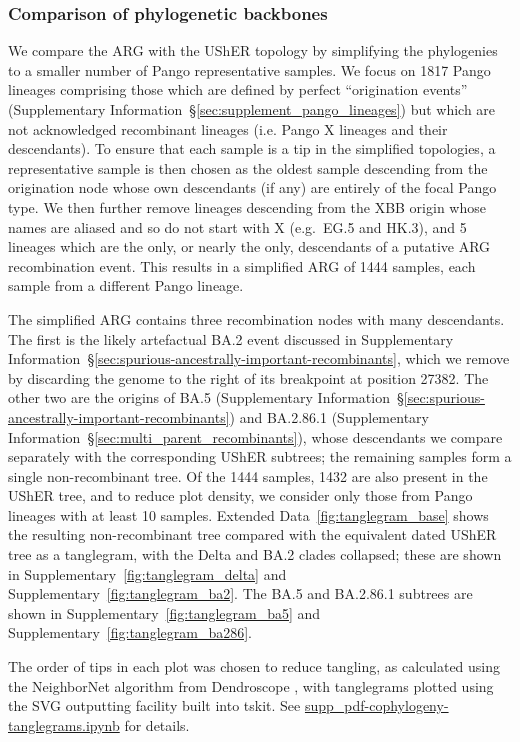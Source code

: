 \documentclass[12pt]{article}
\newcommand{\supref}[1]{Supplementary Information~\S\ref{#1}}
\newcommand{\edref}[1]{Extended Data~\ref{#1}}
\newcommand{\siref}[1]{Supplementary~\ref{#1}}
\begin{document}
\subsubsection*{Comparison of phylogenetic backbones}
We compare the ARG with the UShER topology
by simplifying the phylogenies to a smaller number of
Pango representative samples.
We focus on 1817 Pango lineages comprising those which are defined by perfect ``origination events''
(\supref{sec:supplement_pango_lineages})
but which are not acknowledged recombinant lineages (i.e. Pango X lineages and their descendants).
To ensure that each sample is a tip in the simplified topologies,
a representative sample is then chosen as the oldest sample
descending from the origination node
whose own descendants (if any) are entirely of the focal Pango type.
We then further remove lineages descending from the XBB origin
whose names are aliased and so do not start with X (e.g.\ EG.5 and HK.3),
and 5 lineages which are the only, or nearly the only,
descendants of a putative ARG recombination event.
This results in a simplified ARG of 1444 samples,
each sample from a different Pango lineage.

The simplified ARG contains three recombination nodes with many descendants.
The first is the likely artefactual BA.2 event discussed in
\supref{sec:spurious-ancestrally-important-recombinants},
which we remove by discarding the genome to the right of its breakpoint
at position 27382.
The other two are the origins of BA.5
(\supref{sec:spurious-ancestrally-important-recombinants})
and BA.2.86.1 (\supref{sec:multi_parent_recombinants}),
whose descendants we compare separately with the corresponding UShER subtrees;
the remaining samples form a single non-recombinant tree.
Of the 1444 samples, 1432 are also present in the UShER tree,
and to reduce plot density, we consider
only those from Pango lineages with at least 10 samples.
\edref{fig:tanglegram_base} shows the resulting non-recombinant tree compared with
the equivalent dated UShER tree as a tanglegram,
with the Delta and BA.2 clades collapsed;
these are shown in \siref{fig:tanglegram_delta} and \siref{fig:tanglegram_ba2}.
The BA.5 and BA.2.86.1 subtrees are shown in
\siref{fig:tanglegram_ba5} and \siref{fig:tanglegram_ba286}.

The order of tips in each plot was chosen to reduce tangling,
as calculated using the NeighborNet algorithm from
Dendroscope \cite{Scornavacca2011,Huson2012},
with tanglegrams plotted using the SVG outputting facility built into tskit.
See \href{https://github.com/jeromekelleher/sc2ts-paper/blob/main/notebooks/supp\_pdf-cophylogeny-tanglegrams.ipynb}{supp\_pdf-cophylogeny-tanglegrams.ipynb}
for details.
\end{document}
